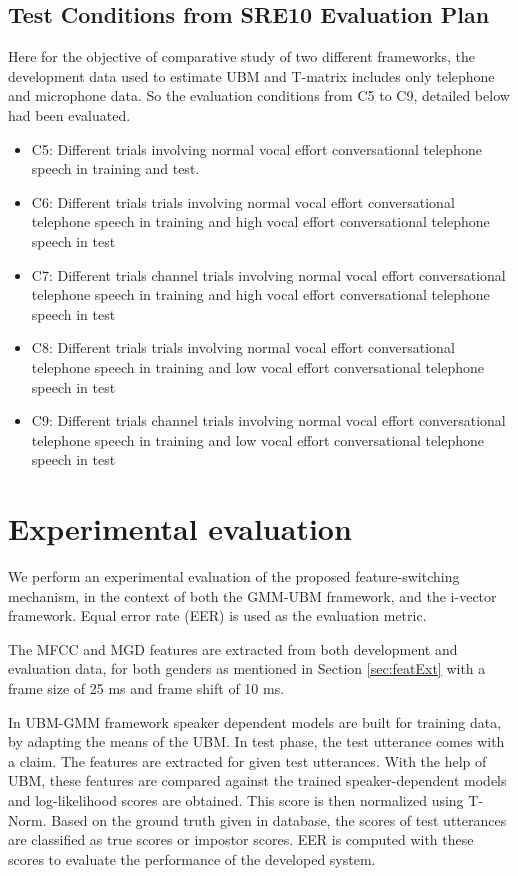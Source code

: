 \documentclass{article}
\begin{document}
\subsection{ \small \bf Test Conditions from SRE10 Evaluation Plan}
\label{subsec:test_conditions}

Here for the objective of comparative study of two different frameworks, the development data used to estimate UBM and T-matrix includes only telephone and microphone data. So the evaluation conditions from C5 to C9, detailed below had been evaluated.

\begin{itemize}
\item C5: Different trials involving normal vocal effort conversational telephone speech in training   and test.
\item C6: Different trials trials involving normal vocal effort conversational telephone speech in training   and high vocal effort conversational telephone speech in test
\item C7: Different trials channel trials involving normal vocal effort conversational telephone speech in training   and high vocal effort conversational telephone speech in test
\item C8: Different trials trials involving normal vocal effort conversational telephone speech in training   and low vocal effort conversational telephone speech in test
\item C9: Different trials channel trials involving normal vocal effort conversational  telephone speech in training   and low vocal effort conversational telephone speech in test
\end{itemize}

\section{Experimental evaluation}
\label{sec:ExpSetup}
We perform an experimental evaluation of the proposed feature-switching
mechanism, in the context of both the GMM-UBM framework, and the i-vector
framework. Equal error rate (EER) is used as the evaluation metric.

The MFCC and MGD features are extracted from both development and evaluation data, for both genders as mentioned in Section \ref{sec:featExt} with a frame size of 25 ms and frame shift of 10 ms.

In UBM-GMM framework speaker dependent models are built for training data, by adapting the means of the UBM. In test phase, the test utterance comes with a claim. The features are extracted for given test utterances. With the help of UBM, these features are compared against the trained speaker-dependent models and log-likelihood scores are obtained. This score is then normalized using T-Norm. Based on the ground truth given in database, the scores of test utterances are classified as true scores or impostor scores. EER is computed with these scores to evaluate the performance of the developed system.
\end{document}
